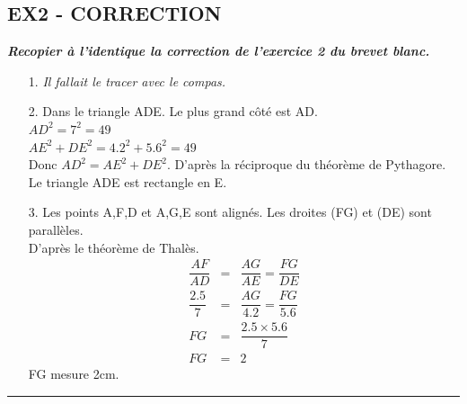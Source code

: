 \documentclass[11pt]{article}
\newcommand{\horrule}[1]{\rule{\linewidth}{#1}} %
\begin{document}
\begin{multicols}{2}

  \subsection*{EX2 - CORRECTION}
  \textit{\textbf{Recopier à l'identique la correction de l'exercice 2 du brevet blanc.}}

  \begin{itemize}
  \item[1.] \textit{Il fallait le tracer avec le compas.}
  \item[2.] Dans le triangle ADE. Le plus grand côté est AD.\\
    $AD^2 = 7^2 = 49$\\
    $AE^2 + DE^2 = 4.2^2 + 5.6^2 = 49$\\
    Donc $AD^2 = AE^2 + DE^2$. D'après la réciproque du théorème de Pythagore. Le triangle ADE est rectangle en E.
  \item[3.] Les points A,F,D et A,G,E sont alignés. Les droites (FG) et (DE) sont parallèles.\\
    D'après le théorème de Thalès.\\
    \begin{eqnarray*}
      \dfrac{AF}{AD} &=& \dfrac{AG}{AE} = \dfrac{FG}{DE} \\
      \dfrac{2.5}{7} &=& \dfrac{AG}{4.2} = \dfrac{FG}{5.6} \\
      FG &=& \dfrac{2.5 \times 5.6}{7} \\
      FG &=& 2
    \end{eqnarray*}
    FG mesure 2cm.
  \end{itemize}

\end{multicols}
\horrule{1px} 
\end{document}
